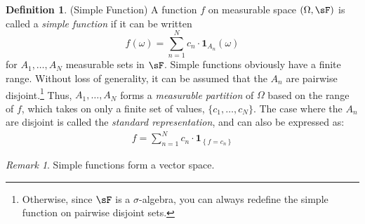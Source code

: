 \documentclass[12pt]{article}
\theoremstyle{plain}
\theoremstyle{definition}
\newtheorem{defn}[thm]{Definition}
\theoremstyle{remark}
\newtheorem*{rmk}{Remark}
\newcommand*{\Chi}{\mbox{\large$\chi$}} %
\newcommand{\one}[1]{\mathbf{1}_{#1}}
\begin{document}
\begin{defn}(Simple Function)
A function $f$ on measurable space $(\Omega,\sF)$ is called a
\emph{simple function} if it can be written
\begin{equation}
  \label{simplefn}
  f(\omega) = \sum^N_{n=1} c_n \cdot \one{A_n}(\omega)
\end{equation}
for $A_1, \ldots, A_N$ measurable sets in $\sF$. Simple functions
obviously have a finite range. Without loss of generality, it can be
assumed that the $A_n$ are pairwise disjoint.\footnote{%
  Otherwise, since $\sF$ is a $\sigma$-algebra, you can always redefine
  the simple function on pairwise disjoint sets.
}
Thus, $A_1,\ldots,A_N$ forms a \emph{measurable partition} of $\Omega$
based on the range of $f$, which takes on only a finite set of values,
$\{c_1, \ldots, c_N\}$. The case where the $A_n$ are disjoint is called
the \emph{standard representation}, and can also be expressed as:
\begin{align*}
  f
  = \sum^N_{n=1} c_n \cdot \one{\left\{f=c_n \right\}}
\end{align*}
\end{defn}
\begin{rmk} Simple functions form a vector space.
\end{rmk}
\end{document}
